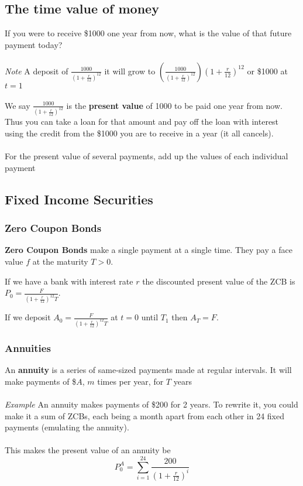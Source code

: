 \documentclass[12pt,letterpaper, twocolumn]{article}
\begin{document}
\subsection{The time value of money}
If you were to receive \$1000 one year from now, what is the value of that future payment today? 
\\\\
\textit{Note} A deposit of $\frac{1000}{(1+\frac{r}{12})^{12}}$ it will grow to $(\frac{1000}{(1+\frac{r}{12})^{12}})(1+\frac{r}{12})^{12}$ or \$1000 at $t=1$
\\\\
We say $\frac{1000}{(1+\frac{r}{12})^{12}}$ is the \textbf{present value} of 1000 to be paid one year from now. Thus you can take a loan for that amount and pay off the loan with interest using the credit from the \$1000 you are to receive in a year (it all cancels). 
\\\\
For the present value of several payments,  add up the values of each individual payment

\subsection{Fixed Income Securities}
\subsubsection{Zero Coupon Bonds}
\textbf{Zero Coupon Bonds} make a single payment at a single time. They pay a face value $f$ at the maturity $T>0$. 

If we have a bank with interest rate $r$ the discounted present value of the ZCB is $P_0 = \frac{F}{(1+\frac{r}{12})^12T}$. 

If we deposit $A_0 = \frac{F}{(1+\frac{r}{12})^12T}$ at $t=0$ until $T_1$ then $A_T = F$. 

\subsubsection{Annuities}
An \textbf{annuity} is a series of same-sized payments made at regular intervals. It will make payments of \$$A$, $m$ times per year, for $T$ years
\\\\
\textit{Example}
An annuity makes payments of \$200 for 2 years. To rewrite it, you could make it a sum of ZCBs, each being a month apart from each other in 24 fixed payments (emulating the annuity). 
\\\\
This makes the present value of an annuity be
 \[P_0^A = \sum_{i=1}^{24}\frac{200}{(1+\frac{r}{12})^i}\]
\end{document}
